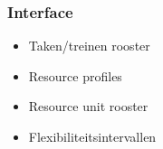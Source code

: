 \begin{frame}\frametitle{Interface}
\begin{itemize}
    \item Taken/treinen rooster
    \item Resource profiles
    \item Resource unit rooster
    \item Flexibiliteitsintervallen
\end{itemize}
\end{frame}
